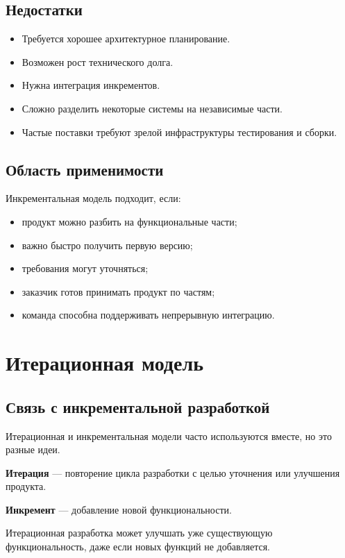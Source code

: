 \documentclass[12pt,a4paper]{article}
\begin{document}
\subsection{Недостатки}

\begin{itemize}
    \item Требуется хорошее архитектурное планирование.
    \item Возможен рост технического долга.
    \item Нужна интеграция инкрементов.
    \item Сложно разделить некоторые системы на независимые части.
    \item Частые поставки требуют зрелой инфраструктуры тестирования и сборки.
\end{itemize}

\subsection{Область применимости}

Инкрементальная модель подходит, если:
\begin{itemize}
    \item продукт можно разбить на функциональные части;
    \item важно быстро получить первую версию;
    \item требования могут уточняться;
    \item заказчик готов принимать продукт по частям;
    \item команда способна поддерживать непрерывную интеграцию.
\end{itemize}

\section{Итерационная модель}

\subsection{Связь с инкрементальной разработкой}

Итерационная и инкрементальная модели часто используются вместе, но это разные идеи.

\textbf{Итерация} --- повторение цикла разработки с целью уточнения или улучшения продукта.

\textbf{Инкремент} --- добавление новой функциональности.

Итерационная разработка может улучшать уже существующую функциональность, даже если новых функций не добавляется.
\end{document}
